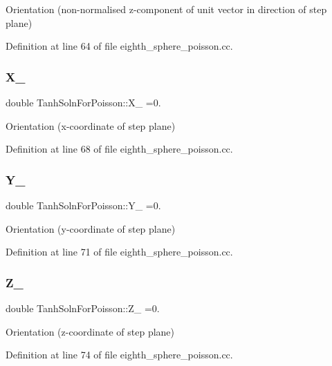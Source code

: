 Orientation (non-\/normalised z-\/component of unit vector in direction of step plane) 



Definition at line 64 of file eighth\+\_\+sphere\+\_\+poisson.\+cc.

\mbox{\label{namespaceTanhSolnForPoisson_af55e0479c15ab58929eb96ee9d6cf07a}} 
\subsubsection{\texorpdfstring{X\+\_}{X\_0}}
{\footnotesize\ttfamily double Tanh\+Soln\+For\+Poisson\+::\+X\+\_ =0.}



Orientation (x-\/coordinate of step plane) 



Definition at line 68 of file eighth\+\_\+sphere\+\_\+poisson.\+cc.

\mbox{\label{namespaceTanhSolnForPoisson_addc6dc6578b16a1d9aa774c25776b921}} 
\subsubsection{\texorpdfstring{Y\+\_}{Y\_0}}
{\footnotesize\ttfamily double Tanh\+Soln\+For\+Poisson\+::\+Y\+\_ =0.}



Orientation (y-\/coordinate of step plane) 



Definition at line 71 of file eighth\+\_\+sphere\+\_\+poisson.\+cc.

\mbox{\label{namespaceTanhSolnForPoisson_abf4856ed1855c34c2b2ea57fd6783644}} 
\subsubsection{\texorpdfstring{Z\+\_}{Z\_0}}
{\footnotesize\ttfamily double Tanh\+Soln\+For\+Poisson\+::\+Z\+\_ =0.}



Orientation (z-\/coordinate of step plane) 



Definition at line 74 of file eighth\+\_\+sphere\+\_\+poisson.\+cc.


